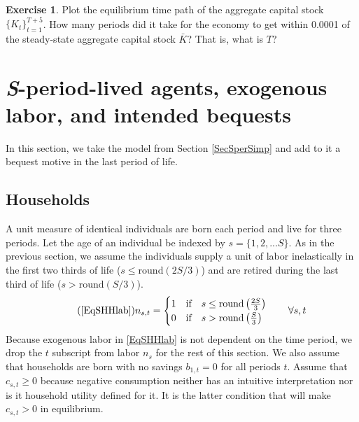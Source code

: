\documentclass[letterpaper,12pt]{article}
\theoremstyle{definition}
\newtheorem{exercise}{Exercise} %
\numberwithin{equation}{section}
\numberwithin{exercise}{section}
\begin{document}
\begin{spacing}{1.5}
      \begin{exercise} \label{ExSperSimp_TPIplot}
         Plot the equilibrium time path of the aggregate capital stock $\{K_t\}_{t=1}^{T+5}$. How many periods did it take for the economy to get within 0.0001 of the steady-state aggregate capital stock $\bar{K}$? That is, what is $T$?
      \end{exercise}


\newpage
\section{\textit{S}-period-lived agents, exogenous labor, and intended bequests}\label{SecSperIntBeq}

   In this section, we take the model from Section \ref{SecSperSimp} and add to it a bequest motive in the last period of life.


   \subsection{Households}\label{SecSperIntBeqHH}

      A unit measure of identical individuals are born each period and live for three periods. Let the age of an individual be indexed by $s = \{1,2,...S\}$. As in the previous section, we assume the individuals supply a unit of labor inelastically in the first two thirds of life ($s\leq \text{round}(2S/3)$) and are retired during the last third of life ($s>\text{round}(S/3)$).
      \begin{equation}\tag{\ref{EqSHHlab}}
         n_{s,t} = \begin{cases}
                      1\quad\text{if}\quad s\leq \text{round}\left(\frac{2S}{3}\right) \\
                      0\quad\text{if}\quad s> \text{round}\left(\frac{S}{3}\right)
                   \end{cases} \quad\forall s,t
      \end{equation}
      Because exogenous labor in \eqref{EqSHHlab} is not dependent on the time period, we drop the $t$ subscript from labor $n_s$ for the rest of this section. We also assume that households are born with no savings $b_{1,t} = 0$ for all periods $t$. Assume that $c_{s,t}\geq 0$ because negative consumption neither has an intuitive interpretation nor is it household utility defined for it. It is the latter condition that will make $c_{s,t}>0$ in equilibrium.


\end{spacing}
\end{document}
